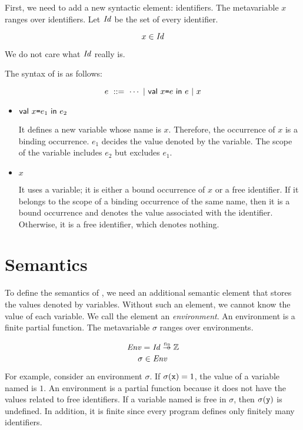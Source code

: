 First, we need to add a new syntactic element: identifiers. The metavariable
$x$ ranges over identifiers. Let $\mbox{\emph{Id}}$ be the set of every
identifier.

\[x\in\mbox{\emph{Id}}\]

We do not care what $\mbox{\emph{Id}}$ really is.

The syntax of \lang is as follows:

\[e\ ::=\ \cdots\ |\ \ebind{x}{e}{e}\ |\ x\]

\begin{itemize}
  \item $\textsf{val}\ x\texttt{=} e_1\ \textsf{in}\ e_2$

    It defines a new variable whose name is $x$. Therefore, the occurrence of $x$ is a
    binding occurrence. $e_1$ decides the value denoted by the variable. The
    scope of the variable includes $e_2$ but excludes $e_1$.

  \item $x$

    It uses a variable; it is either a bound occurrence of $x$ or a free identifier.
    If it belongs to the scope of a binding occurrence of the same name, then it is a
    bound occurrence and denotes the value associated with the identifier.
    Otherwise, it is a free identifier, which denotes nothing.
\end{itemize}

\section{Semantics}

To define the semantics of \lang, we need an additional semantic element that
stores the values denoted by variables. Without such an element, we cannot know the
value of each variable. We call the element an
\textit{environment}. An environment is a finite partial
function. The metavariable $\sigma$ ranges over environments.

\[\embox{Env}=\embox{Id}\finto\mathbb{Z}\]
\[\sigma\in\mbox{\emph{Env}}\]

For example, consider an environment $\sigma$.
If $\sigma(\texttt{x})=1$, the value of a variable named  is $1$.
An environment is a partial function because it does not have the values
related to free identifiers. If a variable named  is free in
$\sigma$, then $\sigma(\texttt{y})$ is undefined.
In addition, it is finite since every program
defines only finitely many identifiers.

